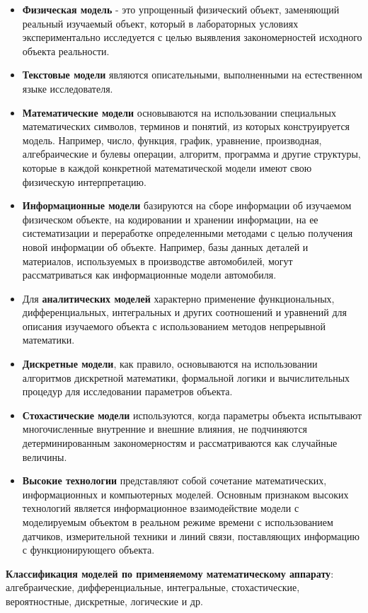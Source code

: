 \documentclass[a4paper, 12pt]{report}
\numberwithin{equation}{section}
\begin{document}
	\begin{itemize}
		\item \textbf{Физическая модель} - это упрощенный физический объект, заменяющий реальный изучаемый объект, который в лабораторных условиях экспериментально исследуется с целью выявления закономерностей исходного объекта реальности.
		\item \textbf{Текстовые модели} являются описательными, выполненными на естественном языке исследователя. 
		\item \textbf{Математические модели} основываются на использовании специальных математических символов, терминов и понятий, из которых конструируется модель. Например, число, функция, график, уравнение, производная, алгебраические и булевы операции, алгоритм, программа и другие структуры, которые в каждой конкретной математической модели имеют свою физическую интерпретацию.
		\item \textbf{Информационные модели} базируются на сборе информации об изучаемом физическом объекте, на кодировании и хранении информации, на ее систематизации и переработке определенными методами с целью получения новой информации об объекте. Например, базы данных деталей и материалов, используемых в производстве автомобилей, могут рассматриваться как информационные модели автомобиля.
		\item Для \textbf{аналитических моделей} характерно применение функциональных, дифференциальных, интегральных и других соотношений и уравнений для описания изучаемого объекта с использованием методов непрерывной математики. 
		\item \textbf{Дискретные модели}, как правило, основываются на использовании алгоритмов дискретной математики, формальной логики и вычислительных процедур для исследовании параметров объекта. 
		\item \textbf{Стохастические модели} используются, когда параметры объекта испытывают многочисленные внутренние и внешние влияния, не подчиняются детерминированным закономерностям и рассматриваются как случайные величины.
		\item \textbf{Высокие технологии} представляют собой сочетание математических, информационных и компьютерных моделей. Основным признаком высоких технологий является информационное взаимодействие модели с моделируемым объектом в реальном режиме времени с использованием датчиков, измерительной техники и линий связи, поставляющих информацию с функционирующего объекта.
	\end{itemize}
	\textbf{Классификация моделей по применяемому математическому аппарату}: алгебраические, дифференциальные, интегральные, стохастические, вероятностные, дискретные, логические и др.
\end{document}
